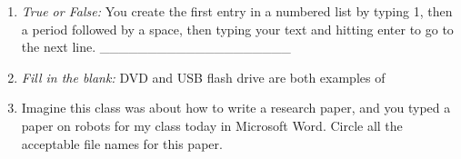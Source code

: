 \documentclass[11pt]{article}
\begin{document}
\begin{enumerate}
\item \emph{True or False:} You create the first entry in a numbered list by typing 1, then a period followed by a space, then typing your text and hitting enter to go to the next line. \_\_\_\_\_\_\_\_\_\_\_\_\_\_\_\_\_\_\_\_
\vspace{1.5mm}

\item \emph{Fill in the blank:} DVD and USB flash drive are both examples of 
\vspace{1.5mm}

\item Imagine this class was about how to write a research paper, and you typed a paper on robots for my class today in Microsoft Word.  Circle all the acceptable file names for this paper.

\vspace{1.5mm}

\end{enumerate}
\end{document}
